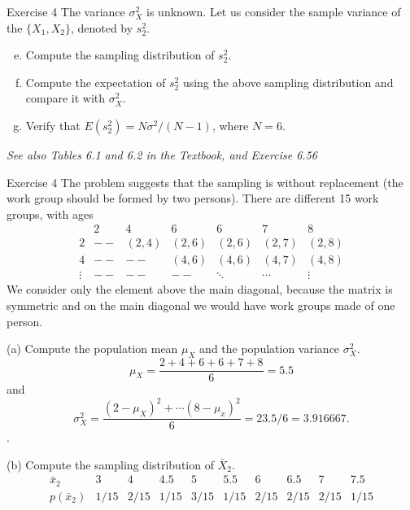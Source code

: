 \documentclass[
  11pt,
  ignorenonframetext,
]{beamer}
\begin{document}
\begin{frame}{Exercise 4}
\protect\hypertarget{exercise-4-2}{}
The variance \(\sigma^2_X\) is unknown. Let us consider the sample
variance of the \(\{X_1,X_2\}\), denoted by \(s^2_2\).

\begin{enumerate}
[(a)]
\setcounter{enumi}{4}
\item
  Compute the sampling distribution of \(s^2_2\).
\item
  Compute the expectation of \(s^2_2\) using the above sampling
  distribution and compare it with \(\sigma^2_X\).
\item
  Verify that \(E(s^2_2)=N\sigma^2/(N-1)\), where \(N=6\).
\end{enumerate}

\emph{See also Tables 6.1 and 6.2 in the Textbook, and Exercise 6.56}
\end{frame}

\begin{frame}{Exercise 4}
\protect\hypertarget{exercise-4-3}{}
The problem suggests that the sampling is without replacement (the work
group should be formed by two persons). There are different 15 work
groups, with ages \[
\begin{array}{c|cccccc}
&2 & 4 & 6 & 6&7 & 8\\ \hline
2  & -- & (2,4) & (2,6) & (2,6) & (2,7) &(2,8)\\
 4  &-- &--  & (4,6) & (4,6) & (4,7) &(4,8)\\
 \vdots  &-- &--  & -- & \ddots & \cdots &\vdots 
\end{array} 
\] We consider only the element above the main diagonal, because the
matrix is symmetric and on the main diagonal we would have work groups
made of one person.
\end{frame}

\begin{frame}{(a) Compute the population mean \(\mu_X\) and the
population variance \(\sigma_X^2\).}
\protect\hypertarget{a-compute-the-population-mean-mu_x-and-the-population-variance-sigma_x2.}{}
\[\mu_X=\frac{2+4+6+6+7+8}{6}=5.5\] and
\[\sigma^2_X=\frac{(2-\mu_X)^2+\cdots (8-\mu_x)^2}{6}=23.5/6=3.916667.\].
\end{frame}

\begin{frame}{(b) Compute the sampling distribution of \(\bar{X}_2\).}
\protect\hypertarget{b-compute-the-sampling-distribution-of-barx_2.}{}
\[
\begin{array}{c|ccccccccc}
\bar{x}_2 & 3 & 4 & 4.5 & 5&  5.5 & 6 & 6.5 & 7& 7.5\\\hline
p(\bar{x}_2) & 1/15 & 2/15 & 1/15 & 3/15 & 1/15 & 2/15 & 2/15 & 2/15 & 1/15
\end{array}
\]
\end{frame}
\end{document}
